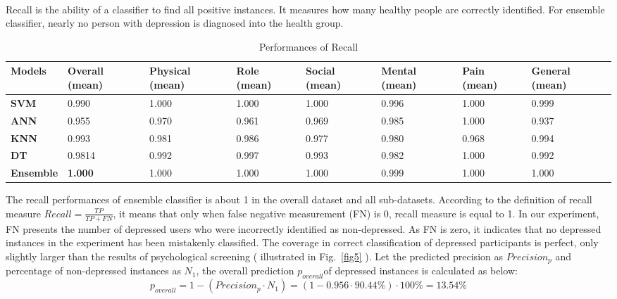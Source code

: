 \documentclass[runningheads]{llncs}
\begin{document}
\paragraph{}
Recall is the ability of a classifier to find all positive instances. It measures how many healthy people are correctly identified. For ensemble classifier, nearly no person with depression is diagnosed into the health group.
\begin{table}[h]
\begin{tabular}{|C{2cm}|C{1.5cm}|C{1.5cm}|C{1.5cm}|C{1.5cm}|C{1.5cm}|C{1.5cm}|C{1.5cm}|}
\hline
{} 
{\color[HTML]{333333} \textbf{Models}} & {\color[HTML]{333333} \textbf{Overall (mean)}} & {\color[HTML]{333333} \textbf{Physical (mean)}} & {\color[HTML]{333333} \textbf{Role (mean)}} &{\color[HTML]{333333} \textbf{Social (mean)}} & {\color[HTML]{333333} \textbf{Mental (mean)}} & {\color[HTML]{333333} \textbf{Pain (mean)}} & {\color[HTML]{333333} \textbf{General (mean)}} \\ \hline
{} 
\textbf{SVM} & 0.990 & 1.000  & 1.000  & 1.000  & 0.996   & 1.000   & 0.999    \\ \hline
{} 
\textbf{ANN}   & 0.955 & 0.970  & 0.961  & 0.969  & 0.985  & 1.000  & 0.937     \\ \hline
{} 
\textbf{KNN}  & 0.993 & 0.981  & 0.986  & 0.977 & 0.980 & 0.968  & 0.994      \\ \hline
{} 
\textbf{DT}  & 0.9814 & 0.992  & 0.997  & 0.993 & 0.982  & 1.000  & 0.992    \\ \hline
{} 
\textbf{Ensemble}   & \textbf{1.000} & 1.000 & 1.000  & 1.000  & 0.999  & 1.000 & 1.000   \\ \hline
\end{tabular}
\caption{Performances of Recall}
\label{Recall}
\end{table}
%
%
%
The recall performances of ensemble classifier is about 1 in the overall dataset and all sub-datasets. According to the definition of recall measure  $ Recall = \frac{TP}{TP + FN} $, it means that only when false negative measurement (FN) is 0, recall measure is equal to 1. In our experiment, FN presents the number of depressed users who were incorrectly identified as non-depressed. As FN is zero, it indicates that no depressed instances in the experiment has been mistakenly classified. The coverage in correct classification of depressed participants is perfect, only slightly larger than the results of psychological screening ( illustrated in Fig.~\ref{fig5} ). Let the predicted precision as $Precision_{p}$ and percentage of non-depressed instances as $N_{1}$, the overall prediction $p_{overall}$of depressed instances is calculated as below:\\
\begin{equation}\label{reio}
	p_{overall} = 1 - (Precision_{p} \cdot N_{1})= (1 -  0.956 \cdot 90.44\%) \cdot 100\% = 13.54\%
\end{equation}
\end{document}
